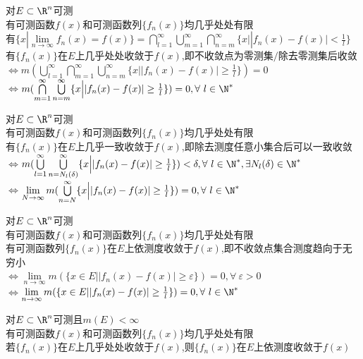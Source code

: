 \begin{dingli}
对$E\subset\R^n$可测\\
有可测函数$f(x)$和可测函数列$\{f_n(x)\}$均几乎处处有限\\
有$\{x|\lim\limits_{n\to\infty}f_n(x)=f(x)\}=\bigcap\limits_{l=1}^{\infty}\bigcup\limits_{m=1}^{\infty}\bigcap\limits_{n=m}^{\infty}\{x\Big||f_n(x)-f(x)|<\frac{1}{l}\}$
有$\{f_n(x)\}$在$E$上几乎处处收敛于$f(x)$,即不收敛点为零测集$/$除去零测集后收敛\\
$\Leftrightarrow$$m(\bigcup\limits_{l=1}^{\infty}\bigcap\limits_{m=1}^{\infty}\bigcup\limits_{n=m}^{\infty}\{x\Big||f_n(x)-f(x)|\geq\frac{1}{l}\})=0$\\
$\Leftrightarrow$$m(\bigcap\limits_{m=1}^{\infty}\bigcup\limits_{n=m}^{\infty}\{x\Big||f_n(x)-f(x)|\geq\frac{1}{l}\})=0,\forall\  l\in\N^*$
\end{dingli}

\begin{dingli}
对$E\subset\R^n$可测\\
有可测函数$f(x)$和可测函数列$\{f_n(x)\}$均几乎处处有限\\
有$\{f_n(x)\}$在$E$上几乎一致收敛于$f(x)$,即除去测度任意小集合后可以一致收敛\\
$\Leftrightarrow$$m(\bigcup\limits_{l=1}^{\infty}\bigcup\limits_{n=N_l(\delta)}^{\infty}\{x\Big||f_n(x)-f(x)|\geq\frac{1}{l}\})<\delta,\forall\  l\in\N^*,\exists N_l(\delta)\in\N^*$\\
$\Leftrightarrow$$\lim\limits_{N\to\infty}m(\bigcup\limits_{n=N}^{\infty}\{x\Big||f_n(x)-f(x)|\geq\frac{1}{l}\})=0,\forall\  l\in\N^*$
\end{dingli}

\begin{dingyi}
对$E\subset\R^n$可测\\
有可测函数$f(x)$和可测函数列$\{f_n(x)\}$均几乎处处有限\\
有可测函数列$\{f_n(x)\}$在$E$上依测度收敛于$f(x)$,即不收敛点集合测度趋向于无穷小\\
$\Leftrightarrow$$\lim\limits_{n\to\infty}m(\{x\in E||f_n(x)-f(x)|\geq\varepsilon\})=0,\forall\ \varepsilon>0$\\
$\Leftrightarrow$$\lim\limits_{n\to\infty}m(\{x\in E||f_n(x)-f(x)|\geq\frac{1}{l}\})=0,\forall\ l\in\N^*$
\end{dingyi}

\begin{dingli}
对$E\subset\R^n$可测且$m(E)<\infty$\\
有可测函数$f(x)$和可测函数列$\{f_n(x)\}$均几乎处处有限\\
若$\{f_n(x)\}$在$E$上几乎处处收敛于$f(x)$,则$\{f_n(x)\}$在$E$上依测度收敛于$f(x)$
\end{dingli}


